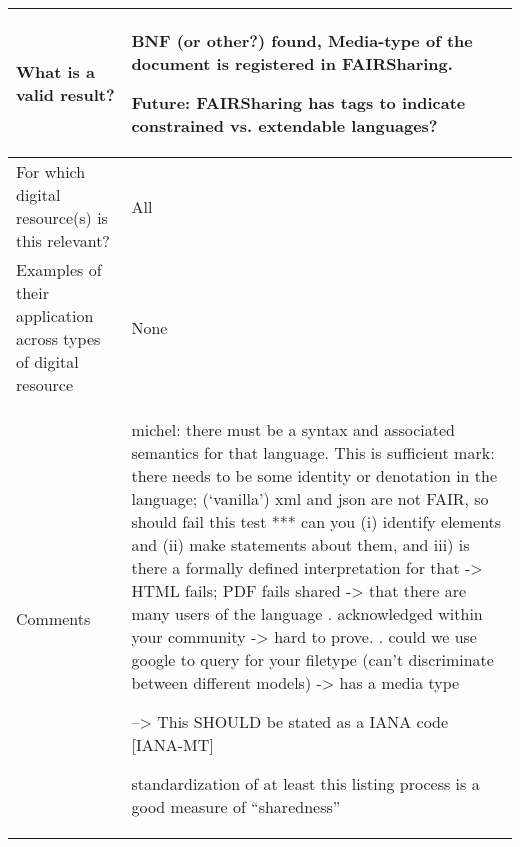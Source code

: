 \documentclass[english]{article}
\begin{document}
\begin{longtable}{|p{5cm}|p{9cm}|}
\\



\hline
What is a valid result? &  


BNF (or other?) found, Media-type of the document is registered in FAIRSharing. 

Future:  FAIRSharing has tags to indicate constrained vs. extendable languages?



\\



\hline
For which digital resource(s) is this relevant? &  All\\



\hline
Examples of their application across types of digital resource &  None

\\



\hline

Comments & 

michel: there must be a syntax and associated semantics for that language.  This is sufficient \newline 
mark: there needs to be some identity or denotation in the language; (‘vanilla’) xml and json are not FAIR, so should fail this test\newline 
\newline 
*** can you (i) identify elements and (ii) make statements about them, and iii) is there a formally defined interpretation for that 
 -> HTML fails; PDF fails
\newline 
shared\newline 
-> that there are many users of the language\newline 
. acknowledged within your community\newline 
 -> hard to prove.\newline 
. could we use google to query for your filetype (can’t discriminate between different models)\newline 
-> has a media type\newline 

--> This SHOULD be stated as a IANA code [IANA-MT]\newline 


standardization of at least this listing process is a good measure of “sharedness”\newline 


\end{longtable}
\end{document}
